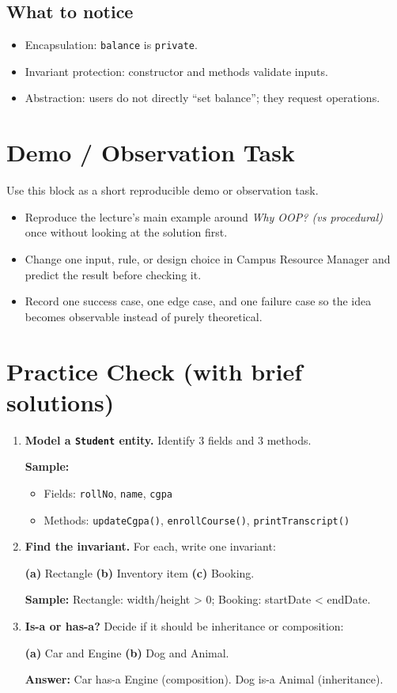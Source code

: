 \documentclass[11pt]{article}
\begin{document}
\subsection*{What to notice}
\begin{itemize}
  \item Encapsulation: \texttt{balance} is \texttt{private}.
  \item Invariant protection: constructor and methods validate inputs.
  \item Abstraction: users do not directly ``set balance''; they request operations.
\end{itemize}
\notesources{\OOPSUnitISources}

\section{Demo / Observation Task}
Use this block as a short reproducible demo or observation task.
\begin{itemize}
  \item Reproduce the lecture's main example around \textit{Why OOP? (vs procedural)} once without looking at the solution first.
  \item Change one input, rule, or design choice in Campus Resource Manager and predict the result before checking it.
  \item Record one success case, one edge case, and one failure case so the idea becomes observable instead of purely theoretical.
\end{itemize}
\notesources{\OOPSUnitISources}

\section{Practice Check (with brief solutions)}
\begin{enumerate}
  \item \textbf{Model a \texttt{Student} entity.} Identify 3 fields and 3 methods.\par
  \textbf{Sample:}
  \begin{itemize}
    \item Fields: \texttt{rollNo}, \texttt{name}, \texttt{cgpa}
    \item Methods: \texttt{updateCgpa()}, \texttt{enrollCourse()}, \texttt{printTranscript()}
  \end{itemize}

  \item \textbf{Find the invariant.} For each, write one invariant:\par
  \textbf{(a)} Rectangle \textbf{(b)} Inventory item \textbf{(c)} Booking.\par
  \textbf{Sample:} Rectangle: width/height > 0; Booking: startDate < endDate.

  \item \textbf{Is-a or has-a?} Decide if it should be inheritance or composition:\par
  \textbf{(a)} Car and Engine \textbf{(b)} Dog and Animal.\par
  \textbf{Answer:} Car has-a Engine (composition). Dog is-a Animal (inheritance).
\end{enumerate}
\end{document}
